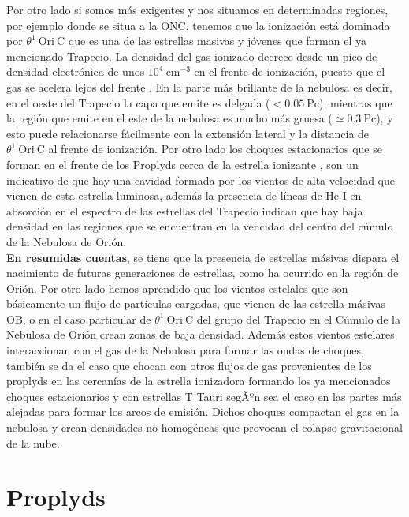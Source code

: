 Por otro lado si somos más exigentes y nos situamos en determinadas regiones, por ejemplo donde se situa a la ONC, tenemos que la ionización está dominada por  \(\theta^1\ \text{Ori}\ \text{C}\) que es una de las estrellas masivas y jóvenes que forman el ya mencionado Trapecio. La densidad del gas ionizado decrece desde un pico de densidad electrónica de unos  \(10^{4}~\text{cm}^{-3}\) en el frente de ionización, puesto que el gas se acelera lejos del frente \citep{Henney:2005a}. En la parte más brillante de la nebulosa es decir, en el oeste del Trapecio la capa que emite es delgada (\(< 0.05 ~\text{Pc}\)), mientras que la región que emite en el este de la nebulosa es mucho más gruesa (\(\simeq 0.3~\text{Pc}\)), y esto puede relacionarse fácilmente con la extensión lateral y la distancia de  \(\theta^1\ \text{Ori}\ \text{C}\) al frente de ionización. Por otro lado los choques estacionarios que se forman en el frente de los Proplyds cerca de la estrella ionizante \citep{Bally:2000a}, son un indicativo de que hay una cavidad formada por los vientos de alta velocidad que vienen de esta estrella luminosa, además  la presencia de líneas de He I en absorción en el espectro de las estrellas del Trapecio \citep{Odell:1993, Baldwin:1991} indican que hay baja densidad en las regiones que se encuentran en la vencidad del centro del cúmulo de la Nebulosa de Orión. \\

\textbf{En resumidas cuentas}, se tiene que la presencia de estrellas másivas dispara el nacimiento de futuras generaciones de estrellas, como ha ocurrido en la región de Orión. Por otro lado hemos aprendido que los vientos estelales que son básicamente un flujo de partículas cargadas, que vienen de las estrella másivas OB, o en el caso particular de \(\theta^1\ \text{Ori}\ \text{C}\) del grupo del Trapecio en el Cúmulo de la Nebulosa de Orión crean zonas de baja densidad. Además estos vientos estelares interaccionan con el gas de la Nebulosa para formar las ondas de choques, también se da el caso que chocan con otros flujos de gas provenientes de los proplyds en las cercanías de la estrella ionizadora formando los ya mencionados choques estacionarios y con estrellas T Tauri segÃºn sea el caso en las partes más alejadas para formar los arcos de emisión. Dichos choques compactan el gas en la nebulosa y crean densidades no homogéneas que provocan el colapso gravitacional de la nube.\\

\section{Proplyds}
\label{sec:proplyds}

